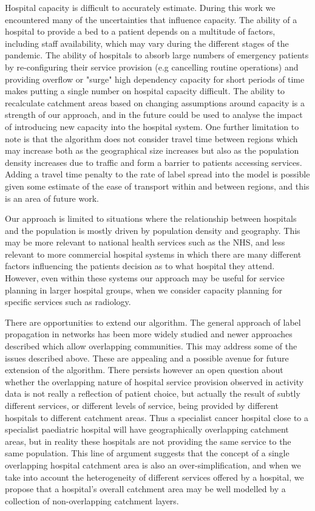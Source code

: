 \documentclass[twocolumn]{bmcart}%
\begin{document}
Hospital capacity is difficult to accurately estimate. During this work we encountered many of the uncertainties that 
influence capacity. The ability of a hospital to provide a bed to a patient depends on a multitude of factors, 
including staff availability, which may vary during the different stages of the pandemic. The ability of hospitals to 
absorb large numbers of emergency patients by re-configuring their service provision (e.g cancelling routine 
operations) and providing overflow or "surge" high dependency capacity for short periods of time makes putting a single 
number on hospital capacity difficult. The ability to recalculate catchment areas based on changing assumptions around 
capacity is a strength of our approach, and in the future could be used to analyse the impact of introducing new 
capacity into the hospital system. One further limitation to note is that the algorithm does not consider travel time 
between regions which may increase both as the geographical size increases but also as the population density increases 
due to traffic and form a barrier to patients accessing services. Adding a travel time penalty to the rate of label 
spread into the model is possible given some estimate of the ease of transport within and between regions, and this is 
an area of future work.

Our approach is limited to situations where the relationship between hospitals and the population is mostly driven by 
population density and geography. This may be more relevant to national health services such as the NHS, and less 
relevant to more commercial hospital systems in which there are many different factors influencing the patients decision 
as to what hospital they attend. However, even within these systems our approach may be useful for service planning in 
larger hospital groups, when we consider capacity planning for specific services such as radiology.

There are opportunities to extend our algorithm. The general approach of label propagation in networks has been more 
widely studied and newer approaches described 
\cite{xieCommunityDetectionUsing2011,gregoryFindingOverlappingCommunities2010,sunDetectingOverlappingCommunities2015} 
which allow overlapping communities. This may address some of the issues described above. These are appealing and a 
possible avenue for future extension of the algorithm. There persists however an open question about whether the 
overlapping nature of hospital service provision observed in activity data is not really a reflection of patient 
choice, but actually the result of subtly different services, or different levels of service, being provided by 
different hospitals to different catchment areas. Thus a specialist cancer hospital close to a specialist paediatric 
hospital will have geographically overlapping catchment areas, but in reality these hospitals are not providing the same 
service to the same population. This line of argument suggests that the concept of a single overlapping hospital 
catchment area is also an over-simplification, and when we take into account the heterogeneity of different services 
offered by a hospital, we propose that a hospital's overall catchment area may be well modelled by a collection of 
non-overlapping catchment layers.
\end{document}
